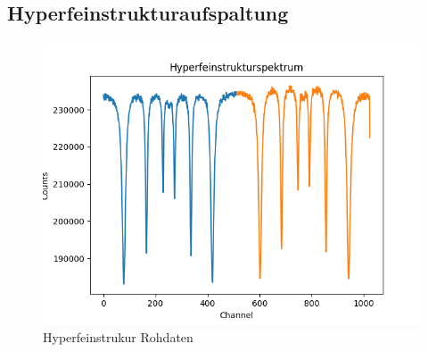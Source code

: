 \documentclass[12pt,a4paper]{article}
\begin{document}
\subsection{Hyperfeinstrukturaufspaltung}
\begin{figure}[H]
\centering
\includegraphics[scale=0.8]{Bilder/Hyperfein/Hyper_Roh.png}
\caption{Hyperfeinstrukur Rohdaten}
\label{fig:Hyper_Roh}
\end{figure}
\end{document}
